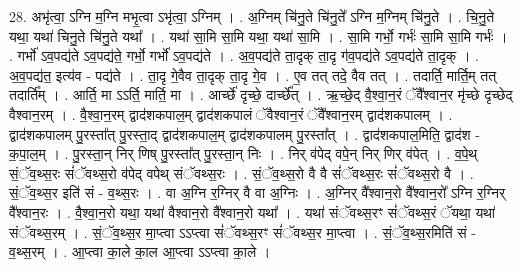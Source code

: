 \documentclass[17pt]{extarticle}
\begin{document}
28. अभृ॑त्वा॒ ऽग्नि म॒ग्नि मभृ॒त्वा ऽभृ॑त्वा॒ ऽग्निम् । . अ॒ग्निम् चि॑नु॒ते चि॑नु॒ते᳚ ऽग्नि म॒ग्निम् चि॑नु॒ते । . चि॒नु॒ते यथा॒ यथा॑ चिनु॒ते चि॑नु॒ते यथा᳚ । . यथा॑ सा॒मि सा॒मि यथा॒ यथा॑ सा॒मि । . सा॒मि गर्भो॒ गर्भः॑ सा॒मि सा॒मि गर्भः॑ । . गर्भो॑ ऽव॒पद्य॑ते ऽव॒पद्य॑ते॒ गर्भो॒ गर्भो॑ ऽव॒पद्य॑ते । . अ॒व॒पद्य॑ते ता॒दृक् ता॒दृ ग॑व॒पद्य॑ते ऽव॒पद्य॑ते ता॒दृक् । . अ॒व॒पद्य॑त॒ इत्य॑व - पद्य॑ते । . ता॒दृ गे॒वैव ता॒दृक् ता॒दृ गे॒व । . ए॒व तत् तदे॒ वैव तत् । . तदार्ति॒ मार्ति॒म् तत् तदार्ति᳚म् । . आर्ति॒ मा ऽऽर्ति॒ मार्ति॒ मा । . आर्च्छे॑ दृच्छे॒ दार्च्छे᳚त् । . ऋ॒च्छे॒द् वै॒श्वा॒न॒रं ॅवै᳚श्वान॒र मृ॑च्छे दृच्छेद् वैश्वान॒रम् । . वै॒श्वा॒न॒रम् द्वाद॑शकपाल॒म् द्वाद॑शकपालं ॅवैश्वान॒रं ॅवै᳚श्वान॒रम् द्वाद॑शकपालम् । . द्वाद॑शकपालम् पु॒रस्ता᳚त् पु॒रस्ता॒द् द्वाद॑शकपाल॒म् द्वाद॑शकपालम् पु॒रस्ता᳚त् । . द्वाद॑शकपाल॒मिति॒ द्वाद॑श - क॒पा॒ल॒म् । . पु॒रस्ता॒न् निर् णिष् पु॒रस्ता᳚त् पु॒रस्ता॒न् निः । . निर् व॑पेद् वपे॒न् निर् णिर् व॑पेत् । . व॒पे॒थ् सं॒ॅव॒थ्स॒रः सं॑ॅवथ्स॒रो व॑पेद् वपेथ् संॅवथ्स॒रः । . सं॒ॅव॒थ्स॒रो वै वै सं॑ॅवथ्स॒रः सं॑ॅवथ्स॒रो वै । . सं॒ॅव॒थ्स॒र इति॑ सं - व॒थ्स॒रः । . वा अ॒ग्नि र॒ग्निर् वै वा अ॒ग्निः । . अ॒ग्निर् वै᳚श्वान॒रो वै᳚श्वान॒रो᳚ ऽग्नि र॒ग्निर् वै᳚श्वान॒रः । . वै॒श्वा॒न॒रो यथा॒ यथा॑ वैश्वान॒रो वै᳚श्वान॒रो यथा᳚ । . यथा॑ संॅवथ्स॒रꣳ सं॑ॅवथ्स॒रं ॅयथा॒ यथा॑ संॅवथ्स॒रम् । . सं॒ॅव॒थ्स॒र मा॒प्त्वा ऽऽप्त्वा सं॑ॅवथ्स॒रꣳ सं॑ॅवथ्स॒र मा॒प्त्वा । . सं॒ॅव॒थ्स॒रमिति॑ सं - व॒थ्स॒रम् । . आ॒प्त्वा का॒ले का॒ल आ॒प्त्वा ऽऽप्त्वा का॒ले । \newline
\end{document}
